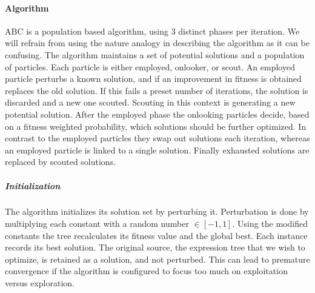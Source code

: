 \paragraph{Algorithm}
ABC is a population based algorithm, using 3 distinct phases per iteration. We will refrain from using the nature analogy in describing the algorithm as it can be confusing. The algorithm maintains a set of potential solutions and a population of particles. Each particle is either employed, onlooker, or scout. An employed particle perturbs a known solution, and if an improvement in fitness is obtained replaces the old solution. If this fails a preset number of iterations, the solution is discarded and a new one scouted. Scouting in this context is generating a new potential solution. After the employed phase the onlooking particles decide, based on a fitness weighted probability, which solutions should be further optimized. In contrast to the employed particles they swap out solutions each iteration, whereas an employed particle is linked to a single solution. Finally exhausted solutions are replaced by scouted solutions.
\subparagraph{Initialization}
The algorithm initializes its solution set by perturbing it. Perturbation is done by multiplying each constant with a random number $\in [-1,1]$. Using the modified constants the tree recalculates its fitness value and the global best. Each instance records its best solution.
The original source, the expression tree that we wish to optimize, is retained as a solution, and not perturbed. This can lead to premature convergence if the algorithm is configured to focus too much on exploitation versus exploration.
 
